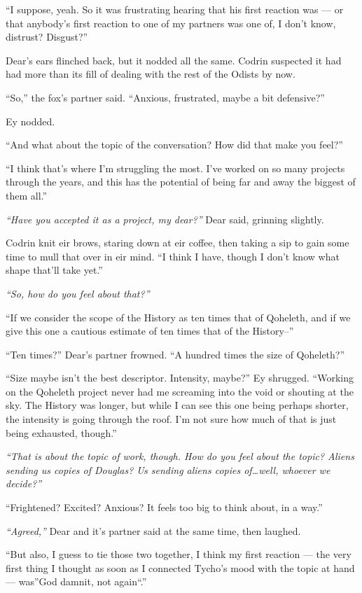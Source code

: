 ``I suppose, yeah. So it was frustrating hearing that his first reaction was — or that anybody's first reaction to one of my partners was one of, I don't know, distrust? Disgust?''

Dear's ears flinched back, but it nodded all the same. Codrin suspected it had had more than its fill of dealing with the rest of the Odists by now.

``So,'' the fox's partner said. ``Anxious, frustrated, maybe a bit defensive?''

Ey nodded.

``And what about the topic of the conversation? How did that make you feel?''

``I think that's where I'm struggling the most. I've worked on so many projects through the years, and this has the potential of being far and away the biggest of them all.''

\emph{``Have you accepted it as a project, my dear?''} Dear said, grinning slightly.

Codrin knit eir brows, staring down at eir coffee, then taking a sip to gain some time to mull that over in eir mind. ``I think I have, though I don't know what shape that'll take yet.''

\emph{``So, how do you feel about that?''}

``If we consider the scope of the History as ten times that of Qoheleth, and if we give this one a cautious estimate of ten times that of the History--''

``Ten times?'' Dear's partner frowned. ``A hundred times the size of Qoheleth?''

``Size maybe isn't the best descriptor. Intensity, maybe?'' Ey shrugged. ``Working on the Qoheleth project never had me screaming into the void or shouting at the sky. The History was longer, but while I can see this one being perhaps shorter, the intensity is going through the roof. I'm not sure how much of that is just being exhausted, though.''

\emph{``That is about the topic of work, though. How do you feel about the topic? Aliens sending us copies of Douglas? Us sending aliens copies of\ldots well, whoever we decide?''}

``Frightened? Excited? Anxious? It feels too big to think about, in a way.''

\emph{``Agreed,''} Dear and it's partner said at the same time, then laughed.

``But also, I guess to tie those two together, I think my first reaction — the very first thing I thought as soon as I connected Tycho's mood with the topic at hand — was''God damnit, not again``.''

